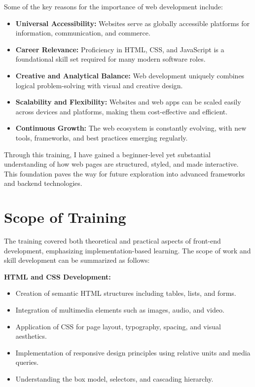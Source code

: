 \documentclass[a4paper,12pt,oneside]{report}
\numberwithin{equation}{chapter}
\numberwithin{figure}{chapter}
\numberwithin{table}{chapter}
\begin{document}
Some of the key reasons for the importance of web development include:

\begin{itemize}
    \item \textbf{Universal Accessibility:} Websites serve as globally accessible platforms for information, communication, and commerce.
    \item \textbf{Career Relevance:} Proficiency in HTML, CSS, and JavaScript is a foundational skill set required for many modern software roles.
    \item \textbf{Creative and Analytical Balance:} Web development uniquely combines logical problem-solving with visual and creative design.
    \item \textbf{Scalability and Flexibility:} Websites and web apps can be scaled easily across devices and platforms, making them cost-effective and efficient.
    \item \textbf{Continuous Growth:} The web ecosystem is constantly evolving, with new tools, frameworks, and best practices emerging regularly.
\end{itemize}

Through this training, I have gained a beginner-level yet substantial understanding of how web pages are structured, styled, and made interactive. This foundation paves the way for future exploration into advanced frameworks and backend technologies.

\section{Scope of Training}

The training covered both theoretical and practical aspects of front-end development, emphasizing implementation-based learning. The scope of work and skill development can be summarized as follows:

\textbf{HTML and CSS Development:}
\begin{itemize}
    \item Creation of semantic HTML structures including tables, lists, and forms.
    \item Integration of multimedia elements such as images, audio, and video.
    \item Application of CSS for page layout, typography, spacing, and visual aesthetics.
    \item Implementation of responsive design principles using relative units and media queries.
    \item Understanding the box model, selectors, and cascading hierarchy.
\end{itemize}
\end{document}
